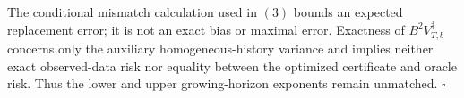 The conditional mismatch calculation used in \((3)\) bounds an expected replacement error; it is not an exact bias or maximal error. Exactness of \(B^2V_{T,b}^{\dagger}\) concerns only the auxiliary homogeneous-history variance and implies neither exact observed-data risk nor equality between the optimized certificate and oracle risk. Thus the lower and upper growing-horizon exponents remain unmatched. \(\square\)